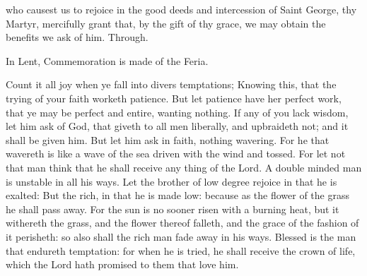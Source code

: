 
\introit
\collect
{} who causest us to rejoice in the good deeds and intercession of Saint George, thy Martyr, mercifully grant that, by the gift of thy grace, we may obtain the benefits we ask of him. Through.
\begin{rubric}
    In Lent, Commemoration is made of the Feria.%
\end{rubric}
 Count it all joy when ye fall into divers temptations; Knowing this, that the trying of your faith worketh patience. But let patience have her perfect work, that ye may be perfect and entire, wanting nothing. If any of you lack wisdom, let him ask of God, that giveth to all men liberally, and upbraideth not; and it shall be given him. But let him ask in faith, nothing wavering. For he that wavereth is like a wave of the sea driven with the wind and tossed. For let not that man think that he shall receive any thing of the Lord. A double minded man is unstable in all his ways. Let the brother of low degree rejoice in that he is exalted: But the rich, in that he is made low: because as the flower of the grass he shall pass away. For the sun is no sooner risen with a burning heat, but it withereth the grass, and the flower thereof falleth, and the grace of the fashion of it perisheth: so also shall the rich man fade away in his ways. Blessed is the man that endureth temptation: for when he is tried, he shall receive the crown of life, which the Lord hath promised to them that love him.

